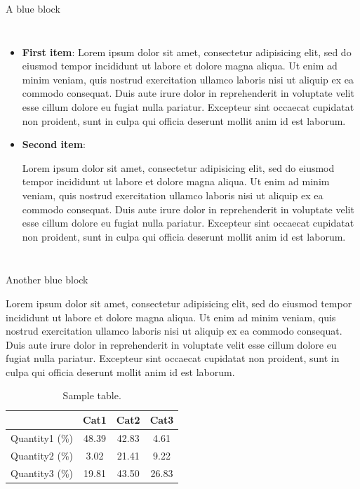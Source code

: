 \documentclass[final]{beamer}
\begin{document}
\begin{frame}{}
\begin{columns}[t]
\begin{column}{.3\linewidth}
\begin{problockBlue}{A blue block}
\begin{columns}[c]
\begin{itemize}
\item \textbf{First item}:
Lorem ipsum dolor sit amet, consectetur adipisicing elit, sed do eiusmod tempor incididunt ut labore et dolore magna aliqua. Ut enim ad minim veniam, quis nostrud exercitation ullamco laboris nisi ut aliquip ex ea commodo consequat. Duis aute irure dolor in reprehenderit in voluptate velit esse cillum dolore eu fugiat nulla pariatur. Excepteur sint occaecat cupidatat non proident, sunt in culpa qui officia deserunt mollit anim id est laborum.

\item \textbf{Second item}:

Lorem ipsum dolor sit amet, consectetur adipisicing elit, sed do eiusmod tempor incididunt ut labore et dolore magna aliqua. Ut enim ad minim veniam, quis nostrud exercitation ullamco laboris nisi ut aliquip ex ea commodo consequat. Duis aute irure dolor in reprehenderit in voluptate velit esse cillum dolore eu fugiat nulla pariatur. Excepteur sint occaecat cupidatat non proident, sunt in culpa qui officia deserunt mollit anim id est laborum.

\end{itemize}

\end{columns}

\end{problockBlue}


\begin{problockBlue}{Another blue block}

Lorem ipsum dolor sit amet, consectetur adipisicing elit, sed do eiusmod tempor incididunt ut labore et dolore magna aliqua. Ut enim ad minim veniam, quis nostrud exercitation ullamco laboris nisi ut aliquip ex ea commodo consequat. Duis aute irure dolor in reprehenderit in voluptate velit esse cillum dolore eu fugiat nulla pariatur. Excepteur sint occaecat cupidatat non proident, sunt in culpa qui officia deserunt mollit anim id est laborum.

\begin{table}[h]  
\begin{center}	
  \begin{tabular}{|c|c|c|c|}
    \cline{2-4}   
    \multicolumn{1}{c|}{} & Cat1 & Cat2  & Cat3 \\ \hline
    Quantity1 (\%) & 48.39  & 42.83 & 4.61\\ \hline
    Quantity2 (\%) & 3.02 & 21.41 & 9.22 \\ \hline
    Quantity3 (\%) & 19.81 & 43.50 & 26.83 \\ \hline
  \end{tabular}
  \end{center}
\caption{Sample table.}
\label{table:sampleTableLabel}
\end{table}


\end{problockBlue}
\end{column}
\end{columns}
\end{frame}
\end{document}
